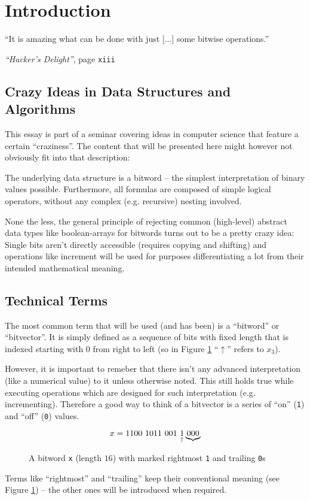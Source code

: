 \section{Introduction}\label{sec:introduction}
\epigraph{
``It is amazing what can be done
with just [...] some bitwise operations.''
}{
\emph{``Hacker's Delight''}, page \texttt{xiii}
\cite{Warren:2012:HD:2462741}
}


\subsection*{Crazy Ideas in Data Structures and Algorithms}
This essay is part of a seminar covering
ideas in computer science that feature a certain ``craziness''.
The content that will be presented here
might however not obviously fit into that description:

The underlying data structure is a bitword
-- the simplest interpretation of binary values possible.
Furthermore, all formulas are composed of simple logical operators,
without any complex (e.g. recursive) nesting involved.

None the less, the general principle of rejecting
common (high-level) abstract data types like boolean-arrays
for bitwords turns out to be a pretty crazy idea:
Single bits aren't directly accessible (requires copying and shifting)
and operations like increment will be used for
purposes differentiating a lot from their intended mathematical meaning.

\subsection*{Technical Terms}
The most common term that will be used (and has been)
is a ``bitword'' or ``bitvector''.
It is simply defined as a sequence of bits with fixed length
that is indexed starting with $0$ from right to left
(so in Figure \ref{fig:bitword} ``$\uparrow$'' refers to $x_3$).

However, it is important to remeber that
there isn't any advanced interpretation (like a numerical value) to it
unless otherwise noted.
This still holds true while executing operations
which are designed for such interpretation (e.g. incrementing).
Therefore a good way to think of a bitvector
is a series of ``on'' (\lstinline{1}) and ``off'' (\lstinline{0}) values.

\begin{figure}[h]
\[
x = \lstinline{1100 1011 001 }
\underset{\uparrow}{\lstinline{1}}
\underbrace{\lstinline{000}}
\]
\caption{
A bitword \lstinline{x} (length $16$)
with marked rightmost \lstinline{1} and trailing \lstinline{0}s
}
\label{fig:bitword}
\end{figure}

Terms like ``rightmost'' and ``trailing''
keep their conventional meaning (see Figure \ref{fig:bitword})
-- the other ones will be introduced when required.
